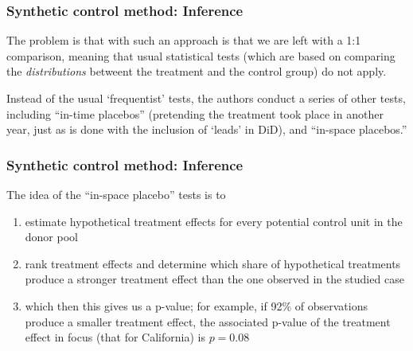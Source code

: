 \documentclass[12pt,english,dvipsnames,aspectratio=169,handout]{beamer}\usepackage[]{graphicx}\usepackage[]{xcolor}
\begin{document}
\begin{frame}
  \frametitle{Synthetic control method: Inference}
\footnotesize

The problem is that with such an approach is that we are left with a 1:1 comparison, meaning that usual statistical tests (which are based on comparing the \emph{distributions} betweent the treatment and the control group) do not apply.

Instead of the usual `frequentist' tests, the authors conduct a series of other tests, including ``in-time placebos'' (pretending the treatment took place in another year, just as is done with the inclusion of `leads' in DiD), and ``in-space placebos.'' 

\vspace{10mm}
\end{frame}


\begin{frame}
  \frametitle{Synthetic control method: Inference}
\footnotesize

The idea of the ``in-space placebo'' tests is to

\begin{enumerate}
  \item estimate hypothetical treatment effects for every potential control unit in the donor pool
  \item rank treatment effects and determine which share of hypothetical treatments produce a stronger treatment effect than the one observed in the studied case
  \item which then this gives us a p-value; for example, if 92\% of observations produce a smaller treatment effect, the associated p-value of the treatment effect in focus (that for California) is $p=0.08$
\end{enumerate} 
\end{frame}
\end{document}

